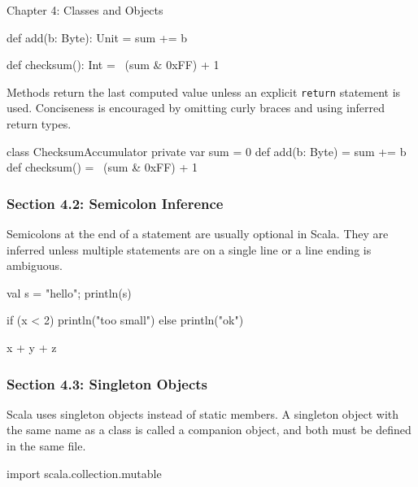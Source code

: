 \begin{notes}{Chapter 4: Classes and Objects}
\begin{highlight}[Encapsulation]
\begin{code}[Scala]
{        def add(b: Byte): Unit = { sum += b }

        def checksum(): Int = ~(sum & 0xFF) + 1
    }
    \end{code}
    \end{highlight}

    Methods return the last computed value unless an explicit \texttt{return} statement is used. Conciseness is encouraged by omitting curly braces and using inferred return types.

    \begin{highlight}
    \begin{code}[Scala]
    class ChecksumAccumulator {
        private var sum = 0
        def add(b: Byte) = sum += b
        def checksum() = ~(sum & 0xFF) + 1
    }
    \end{code}
    \end{highlight}

    \subsubsection*{Section 4.2: Semicolon Inference}

    Semicolons at the end of a statement are usually optional in Scala. They are inferred unless multiple statements are on a single line or a line ending is ambiguous.

    \begin{highlight}
    \begin{code}[Scala]
    val s = "hello"; println(s)

    if (x < 2)
        println("too small")
    else
        println("ok")

    x +
    y +
    z
    \end{code}
    \end{highlight}

    \subsubsection*{Section 4.3: Singleton Objects}

    Scala uses singleton objects instead of static members. A singleton object with the same name as a class is called a companion object, and both must be defined in the same file.

    \begin{highlight}
    \begin{code}[Scala]
    import scala.collection.mutable


\end{code}
\end{highlight}
\end{notes}
